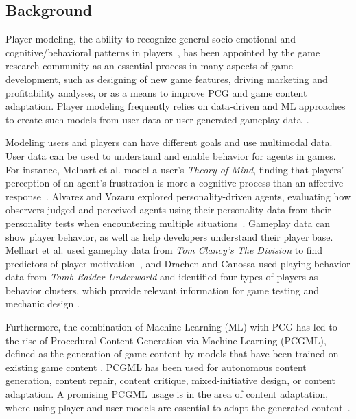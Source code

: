\subsection{Background}


Player modeling, the ability to recognize general socio-emotional and cognitive/behavioral patterns in players~\cite{p10thawonmas2019artificial}, has been appointed by the game research community as an essential process in many aspects of game development, such as designing of new game features, driving marketing and profitability analyses, or as a means to improve PCG and game content adaptation. Player modeling frequently relies on data-driven and ML approaches to create such models from user data or user-generated gameplay data~\cite{p10melhart2020feel,Melhart2019-ModellingMotivation,canossa2015towards,Holmgard2019-proceduralPersonas}. 

Modeling users and players can have different goals and use multimodal data. User data can be used to understand and enable behavior for agents in games. For instance, Melhart et al. model a user's \textit{Theory of Mind}, finding that players' perception of an agent's frustration is more a cognitive process than an affective response~\cite{p10melhart2020feel}. Alvarez and Vozaru explored personality-driven agents, evaluating how observers judged and perceived agents using their personality data from their personality tests when encountering multiple situations~\cite{p10Alvoz2019-PersonalityDriven}. Gameplay data can show player behavior, as well as help developers understand their player base. Melhart et al. used gameplay data from \textit{Tom Clancy's The Division} to find predictors of player motivation~\cite{p10Melhart2019-ModellingMotivation}, and Drachen and Canossa used playing behavior data from \textit{Tomb Raider Underworld} and identified four types of players as behavior clusters, which provide relevant information for game testing and mechanic design \cite{p10Drachen2009-playerModellingTombRaider}.

Furthermore, the combination of Machine Learning (ML) with PCG has led to the rise of Procedural Content Generation via Machine Learning (PCGML), defined as the generation of game content by models that have been trained on existing game content \cite{p10summerville2018procedural}. PCGML has been used for autonomous content generation, content repair, content critique, mixed-initiative design, or content adaptation. A promising PCGML usage is in the area of content adaptation, where using player and user models are essential to adapt the generated content~\cite{p10Duque2021-BayesianbasedPlayerModel,togelius2007-AutomaticPersonalisedRaceGames,Yannakakis2011-experiencedrivenPCG}. 

